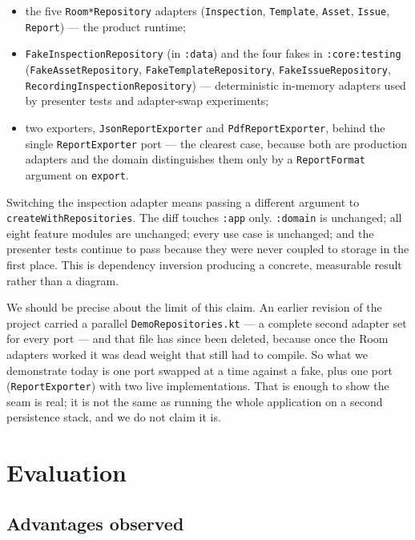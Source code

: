 \documentclass[11pt,a4paper]{article}
\newcommand{\mdl}[1]{\texttt{#1}}
\newcommand{\file}[1]{{\small\texttt{#1}}}
\begin{document}
\begin{itemize}[leftmargin=*]
  \item the five \file{Room*Repository} adapters
        (\file{Inspection}, \file{Template}, \file{Asset}, \file{Issue},
        \file{Report}) --- the product runtime;
  \item \file{FakeInspectionRepository} (in \mdl{:data}) and the four fakes in
        \mdl{:core:testing} (\file{FakeAssetRepository},
        \file{FakeTemplateRepository}, \file{FakeIssueRepository},
        \file{RecordingInspectionRepository}) --- deterministic in-memory
        adapters used by presenter tests and adapter-swap experiments;
  \item two exporters, \file{JsonReportExporter} and \file{PdfReportExporter},
        behind the single \file{ReportExporter} port --- the clearest case,
        because both are production adapters and the domain distinguishes them
        only by a \file{ReportFormat} argument on \texttt{export}.
\end{itemize}

Switching the inspection adapter means passing a different argument to
\texttt{createWithRepositories}. The diff touches \mdl{:app} only. \mdl{:domain}
is unchanged; all eight feature modules are unchanged; every use case is
unchanged; and the presenter tests continue to pass because they were never
coupled to storage in the first place. This is dependency inversion producing a
concrete, measurable result rather than a diagram.

We should be precise about the limit of this claim. An earlier revision of the
project carried a parallel \file{DemoRepositories.kt} --- a complete second
adapter set for every port --- and that file has since been deleted, because once
the Room adapters worked it was dead weight that still had to compile. So what we
demonstrate today is one port swapped at a time against a fake, plus one port
(\file{ReportExporter}) with two live implementations. That is enough to show the
seam is real; it is not the same as running the whole application on a second
persistence stack, and we do not claim it is.

\section{Evaluation}
\label{sec:eval}

\subsection{Advantages observed}
\end{document}
